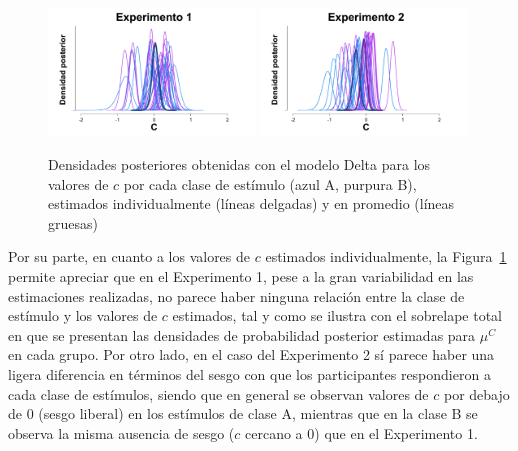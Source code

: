 \begin{figure}[h]
\centering
\includegraphics[width=0.49\textwidth]{Figures/MDelta_Cbias_E1}
 \includegraphics[width=0.49\textwidth]{Figures/MDelta_Cbias_E2}\\
\decoRule
\caption[Modelo Delta: Densidades posteriores de los valores de $c$ estimados individualmente y en promedio, por cada experimento]{Densidades posteriores obtenidas con el modelo Delta para los valores de $c$ por cada clase de estímulo (azul A, purpura B), estimados individualmente (líneas delgadas) y en promedio (líneas gruesas)}
\label{fig:Delta_Cbias}
\end{figure}


Por su parte, en cuanto a los valores de $c$ estimados individualmente, la Figura~\ref{fig:Delta_Cbias} permite apreciar que en el Experimento 1, pese a la gran variabilidad en las estimaciones realizadas, no parece haber ninguna relación entre la clase de estímulo y los valores de $c$ estimados, tal y como se ilustra con el sobrelape total en que se presentan las densidades de probabilidad posterior estimadas para $\mu^C$ en cada grupo. Por otro lado, en el caso del Experimento 2 sí parece haber una ligera diferencia en términos del sesgo con que los participantes respondieron a cada clase de estímulos, siendo que en general se observan valores de $c$ por debajo de 0 (sesgo liberal) en los estímulos de clase A, mientras que en la clase B se observa la misma ausencia de sesgo ($c$ cercano a $0$) que en el Experimento 1.\\

